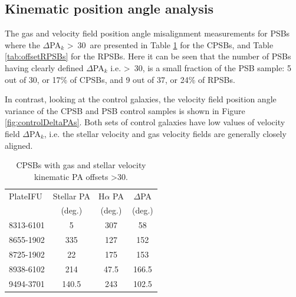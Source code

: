 
\subsection{Kinematic position angle analysis}
\label{PA-misalignment}
The gas and velocity field position angle misalignment measurements for PSBs where the $\Delta$PA$_{k}$ \textgreater\ 30\textdegree\ are presented in Table \ref{tab:offsetCPSBs} for the CPSBs, and Table \ref{tab:offsetRPSBs} for the RPSBs. Here it can be seen that the number of PSBs having clearly defined $\Delta$PA$_{k}$ i.e. \textgreater\ 30\textdegree, is a small fraction of the PSB sample: 5 out of 30, or 17\% of CPSBs, and 9 out of 37, or 24\% of RPSBs. 

In contrast, looking at the control galaxies, the velocity field position angle variance of the CPSB and PSB control samples is shown in Figure \ref{fig:controlDeltaPAs}. Both sets of control galaxies have low values of velocity field $\Delta$PA$_{k}$, i.e. the stellar velocity and gas velocity fields are generally closely aligned.

\begin{table}
\centering
\caption{CPSBs with gas and stellar velocity kinematic PA offsets \textgreater 30\textdegree.}
\label{tab:offsetCPSBs}
\begin{tabular}{lccc}
\hline
PlateIFU  & Stellar PA & H$\alpha$ PA & $\Delta$PA \\
  & (deg.) & (deg.) & (deg.) \\
\hline
8313-6101 & 5 & 307 & 58 \\
8655-1902 & 335 & 127 & 152 \\
8725-1902 & 22 & 175 & 153 \\
8938-6102 & 214 & 47.5 & 166.5 \\
9494-3701 & 140.5 & 243 & 102.5 \\
\hline
\end{tabular}
\end{table}


